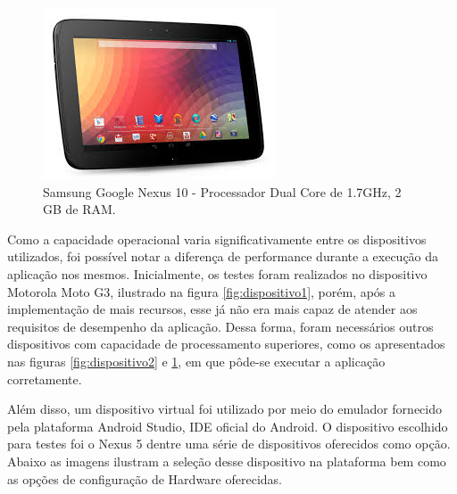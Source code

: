 	\begin{figure}[!htb]
       \begin{center}  
          \includegraphics[width=0.3\columnwidth]{img/dispositivo3.jpg}
           \caption{\label{fig:dispositivo3}Samsung Google Nexus 10 - Processador Dual Core de 1.7GHz, 2 GB de RAM.}
       \end{center}
   \end{figure}
\clearpage   

Como a capacidade operacional varia significativamente entre os dispositivos utilizados, foi possível notar a diferença de performance durante a execução da aplicação nos mesmos. Inicialmente, os testes foram realizados no dispositivo Motorola Moto G3, ilustrado na figura \ref{fig:dispositivo1}, porém, após a implementação de mais recursos, esse já não era mais capaz de atender aos requisitos de desempenho da aplicação. Dessa forma, foram necessários outros dispositivos com capacidade de processamento superiores, como os apresentados nas figuras \ref{fig:dispositivo2} e \ref{fig:dispositivo3}, em que pôde-se executar a aplicação corretamente. 

Além disso, um dispositivo virtual foi utilizado por meio do emulador fornecido pela plataforma Android Studio, IDE oficial do Android. O dispositivo escolhido para testes foi o Nexus 5 dentre uma série de dispositivos oferecidos como opção. Abaixo as imagens ilustram a seleção desse dispositivo na plataforma bem como as opções de configuração de Hardware oferecidas.

